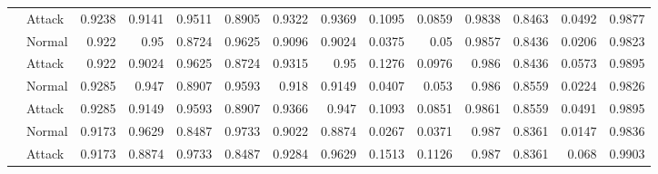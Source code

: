 \begin{tabular}{llrrrrrrrrrrrr}
                & Attack     &     0.9238 &      0.9141 &   0.9511 &        0.8905 &     0.9322 & 0.9369 & 0.1095 & 0.0859 &    0.9838 & 0.8463 & 0.0492 &   0.9877 \\
                & Normal     &     0.922  &      0.95   &   0.8724 &        0.9625 &     0.9096 & 0.9024 & 0.0375 & 0.05   &    0.9857 & 0.8436 & 0.0206 &   0.9823 \\
                & Attack     &     0.922  &      0.9024 &   0.9625 &        0.8724 &     0.9315 & 0.95   & 0.1276 & 0.0976 &    0.986  & 0.8436 & 0.0573 &   0.9895 \\
                & Normal     &     0.9285 &      0.947  &   0.8907 &        0.9593 &     0.918  & 0.9149 & 0.0407 & 0.053  &    0.986  & 0.8559 & 0.0224 &   0.9826 \\
                & Attack     &     0.9285 &      0.9149 &   0.9593 &        0.8907 &     0.9366 & 0.947  & 0.1093 & 0.0851 &    0.9861 & 0.8559 & 0.0491 &   0.9895 \\
                & Normal     &     0.9173 &      0.9629 &   0.8487 &        0.9733 &     0.9022 & 0.8874 & 0.0267 & 0.0371 &    0.987  & 0.8361 & 0.0147 &   0.9836 \\
                & Attack     &     0.9173 &      0.8874 &   0.9733 &        0.8487 &     0.9284 & 0.9629 & 0.1513 & 0.1126 &    0.987  & 0.8361 & 0.068  &   0.9903 \\
\hline
\end{tabular}